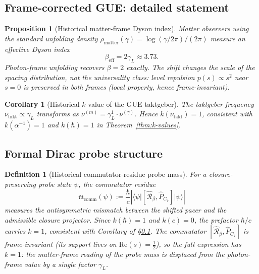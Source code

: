 \documentclass[12pt,a4paper]{article}
\newtheorem{proposition}[theorem]{Proposition}
\newtheorem{corollary}[theorem]{Corollary}
\newtheorem{definition}[theorem]{Definition}
\newcommand{\gL}{\gamma_L}
\begin{document}
\subsection{Frame-corrected GUE: detailed statement}
\label{app:gue-frame}

\begin{proposition}[Historical matter-frame Dyson index]
Matter observers using the standard unfolding density
$\rho_{\mathrm{matter}}(\gamma)=\log(\gamma/2\pi)/(2\pi)$
measure an effective Dyson index
\[
  \beta_{\mathrm{eff}} = 2\gL\approx 3.73.
\]
Photon-frame unfolding recovers $\beta=2$ exactly.
The shift changes the scale of the spacing distribution, not the
universality class: level repulsion $p(s)\propto s^2$ near $s=0$ is
preserved in both frames (local property, hence frame-invariant).
\end{proposition}

\begin{corollary}[Historical $k$-value of the GUE taktgeber]
The taktgeber frequency $\nu_{\mathrm{takt}}\propto\gL$
transforms as $\nu^{(m)}=\gL^1\cdot\nu^{(\gamma)}$.
Hence $k(\nu_{\mathrm{takt}})=1$, consistent with $k(\alpha^{-1})=1$
and $k(\hbar)=1$ in Theorem~\ref{thm:k-values}.
\end{corollary}

\subsection{Formal Dirac probe structure}
\label{app:dirac-formal}

\begin{definition}[Historical commutator-residue probe mass]
For a closure-preserving probe state $\psi$, the commutator residue
\[
  \mathfrak{m}_{\mathrm{comm}}(\psi)
  := \frac{\hbar}{c}
     \left|
     \bigl\langle\psi\big|
     [\hat{\mathcal{R}}_\beta,\hat P_{C_7}]
     \big|\psi\bigr\rangle
     \right|
\]
measures the antisymmetric mismatch between the shifted pacer and the
admissible closure projector.
Since $k(\hbar)=1$ and $k(c)=0$, the prefactor $\hbar/c$ carries
$k=1$, consistent with Corollary of \S\ref{app:gue-frame}.
The commutator $[\hat{\mathcal{R}}_\beta,\hat P_{C_7}]$ is
frame-invariant (its support lives on $\mathrm{Re}(s)=\tfrac{1}{2}$),
so the full expression has $k=1$: the matter-frame reading of the probe
mass is displaced from the photon-frame value by a single factor $\gL$.
\end{definition}
\end{document}
